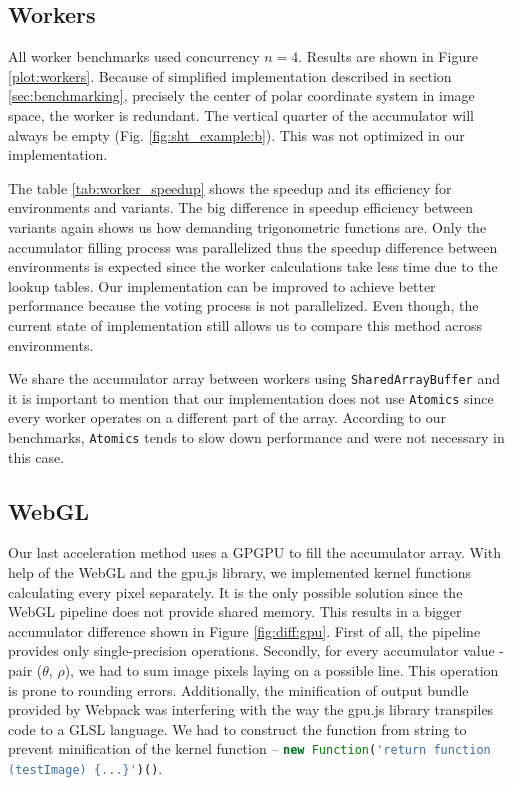 

\subsection{Workers}

All worker benchmarks used concurrency $n=4$. Results are shown in Figure \ref{plot:workers}. Because of simplified implementation described in section \ref{sec:benchmarking}, precisely the center of polar coordinate system in image space, the  worker is redundant. The  vertical quarter of the accumulator will always be empty (Fig. \ref{fig:sht_example:b}). This was not optimized in our implementation.

 
The table \ref{tab:worker_speedup} shows the speedup and its efficiency for environments and variants. The big difference in speedup efficiency between variants again shows us how demanding trigonometric functions are. Only the accumulator filling process was parallelized thus the speedup difference between environments is expected since the worker calculations take less time due to the lookup tables. Our implementation can be improved to achieve better performance because the voting process is not parallelized. Even though, the current state of implementation still allows us to compare this method across environments.

We share the accumulator array between workers using \texttt{SharedArrayBuffer} and it is important to mention that our implementation does not use \texttt{Atomics} since every worker operates on a different part of the array. According to our benchmarks, \texttt{Atomics} tends to slow down performance and were not necessary in this case.



\subsection{WebGL}

Our last acceleration method uses a GPGPU to fill the accumulator array. With help of the WebGL and the gpu.js library, we implemented kernel functions calculating every pixel separately. It is the only possible solution since the WebGL pipeline does not provide shared memory. This results in a bigger accumulator difference shown in Figure \ref{fig:diff:gpu}. First of all, the pipeline provides only single-precision operations. Secondly, for every accumulator value - pair ($\theta$, $\rho$), we had to sum image pixels laying on a possible line. This operation is prone to rounding errors. Additionally, the minification of output bundle provided by Webpack was interfering with the way the gpu.js library transpiles code to a GLSL language. We had to construct the function from string to prevent minification of the kernel function -- \lstinline[language=JavaScript]|new Function('return function (testImage) {...}')()|.

